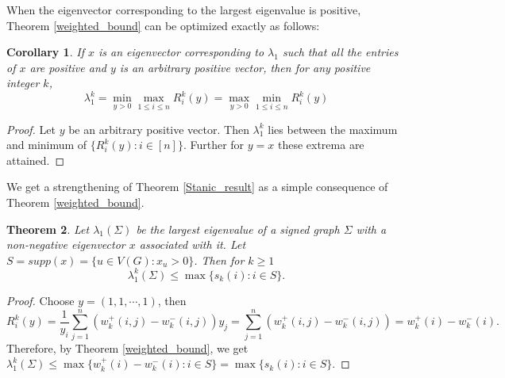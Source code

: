 \documentclass[12pt]{article}
\theoremstyle{plain}
\newtheorem{theorem}{Theorem}[section]
\newtheorem{corollary}[theorem]{Corollary}
\numberwithin{equation}{section}
\begin{document}
	When the eigenvector corresponding to the largest eigenvalue is positive, Theorem \ref{weighted_bound} can be optimized exactly as follows:\\
	\begin{corollary}
		If $x $ is an eigenvector corresponding to $\lambda_1$ such that all the entries of $x$ are positive and $y$ is an arbitrary positive vector, then for any positive integer $k$, $$\lambda_1^k= \min \limits_{y > 0} \max \limits_{1 \leq i \leq n} R_i^{k}(y)= \max \limits_{y > 0} \min \limits_{1 \leq i \leq n} R_i^{k}(y)$$
	\end{corollary}
	\begin{proof}
		Let $y$ be an arbitrary positive vector. Then $\lambda_1^k$ lies between the maximum and minimum of  $\{R^{k}_i(y) : i \in [n]\}$. Further for $y=x$ these extrema are attained.
	\end{proof}
	We get a strengthening of Theorem \ref{Stanic_result} as a simple consequence of Theorem \ref{weighted_bound}.
	\begin{theorem}\label{improve_Stanic_result}
		Let $\lambda_{1}(\Sigma)$ be the largest eigenvalue of a signed graph $\Sigma$ with a non-negative eigenvector $x$ associated with it. Let $S=supp(x) = \{ u \in V(G): x_u > 0\}$. Then for $k \geq 1$
		\[\lambda_{1}^{k}(\Sigma)\leq \max\{s_k(i) : i \in S\}.\]
	\end{theorem}
	\begin{proof}
		Choose $y=(1,1, \cdots, 1)$, then \[R^{k}_i(y)=\frac{1}{y_{i}}\sum_{j=1}^{n}(w_{k}^{+}(i,j)-w_{k}^{-}(i,j))y_{j}=\sum_{j=1}^{n}(w_{k}^{+}(i,j)-w_{k}^{-}(i,j))=w_{k}^{+}(i)-w_{k}^{-}(i).\]
		Therefore, by Theorem \ref{weighted_bound}, we get $\lambda_{1}^{k}(\Sigma)\leq \max\{w_{k}^{+}(i)-w_{k}^{-}(i) : i \in S\}=\max\{s_k(i) : i \in S\}.$ 
	\end{proof}
	
\end{document}
